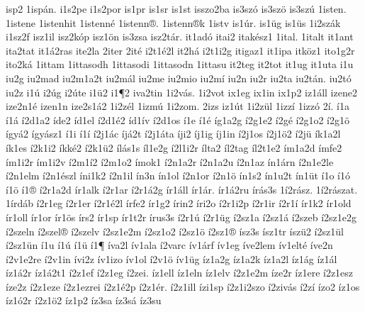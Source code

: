 {isp2
1isp^^e1n.
i1s2pe
i1s2por
is1pr
is1sr
is1st
isszo2ba
is3sz^^f3
is3sz^^f6
is3sz^^fa
1isten.
1istene
1istenhit
1istenn^^e9
1istenn^^ae.
1istenn^^aek
1istv
is1^^far.
is1^^fcg
is1^^fcs
1i2sz^^e1k
i1sz2f
isz1il
isz2k^^f3p
isz1^^f6n
is3zsa
isz2t^^e1r.
it1ad^^f3
itai2
itak^^e9sz1
1ital.
1italt
it1ant
ita2tat
it1^^e12ras
ite2la
2iter
2it^^e9
i2t1^^e92l
it2h^^e1
i2t1i2g
itigaz1
it1ipa
itk^^f6z1
ito1g2r
ito2k^^e1
1ittam
1ittasodh
1ittasodi
1ittasodn
1ittasu
it2teg
it2tot
it1ug
it1uta
i1u
iu2g
iu2mad
iu2m1a2t
iu2m^^e1l
iu2me
iu2mio
iu2m^^ed
iu2n
iu2r
iu2ta
iu2t^^e1n.
iu2t^^f3
iu2z
i1^^fa
i2^^fag
i2^^fate
i1^^fc2
i1^^b62
iva2tin
1i2v^^e1s.
1i2vot
ix1eg
ix1in
ix1p2
iz1^^e1ll
izene2
ize2n1^^e9
izen1n
ize2s1^^e12
1i2z^^e9l
1izm^^fa
1i2zom.
2izs
iz1^^fat
1i2z^^fcl
1izz^^ed
1izz^^f3
2^^ed.
^^ed1a
^^ed1^^e1
^^ed2d1a2
^^edde2
^^edd1el
^^ed2d1^^e92
^^edd1^^edv
^^ed2d1os
^^ed1e
^^ed1^^e9
^^edg1a2g
^^ed2g1e2
^^ed2g^^e9
^^ed2g1o2
^^ed2g1^^f6
^^edgy^^e12
^^edgy^^e1sz1
^^ed1i
^^ed1^^ed
^^ed2j1^^e1c
^^edj^^e12t
^^ed2j1^^e1ta
^^edji2
^^edj1ig
^^edj1in
^^ed2j1os
^^ed2j1^^f62
^^ed2j^^fc
^^edk1a2l
^^edk1es
^^ed2k1i2
^^edkk^^e92
^^ed2k1^^fc2
^^edl^^e1s1s
^^edl1e2g
^^ed2l1i2r
^^edlta2
^^edl2tag
^^edl2t1e2
^^edm1a2d
^^edmfe2
^^edm1i2r
^^edm1i2v
^^ed2m1^^ed2
^^ed2m1o2
^^edmok1
^^ed2n1a2r
^^ed2n1a2u
^^ed2n1az
^^edn1^^e1rn
^^ed2n1e2le
^^ed2n1elm
^^ed2n1^^e9szl
^^edni1k2
^^ed2n1il
^^edn3n
^^edn1ol
^^ed2n1or
^^ed2n1^^f6
^^edn1s2
^^edn1u2t
^^edn1^^fct
^^ed1o
^^ed1^^f3
^^ed1^^f6
^^ed1^^ae
^^ed2r1a2d
^^edr1alk
^^ed2r1ar
^^ed2r1^^e12g
^^edr1^^e1ll
^^edr1^^e1r.
^^edr1^^e12ru
^^edr^^e1s3s
1^^ed2r^^e1sz.
1^^ed2r^^e1szat.
1^^edrd^^e1b
^^ed2r1eg
^^ed2r1er
^^ed2r1^^e92l
^^edrfe2
^^edr1g2
^^edrin2
^^edri2o
^^ed2r1i2p
^^ed2r1ir
^^ed2r1^^ed
^^edr1k2
^^edr1old
^^edr1oll
^^edr1or
^^edr1^^f6s
^^edrs2
^^edr1sp
^^edr1t2r
^^edrus3s
^^ed2r1^^fa
^^ed2r1^^fcg
^^ed2sz1a
^^ed2sz1^^e1
^^ed2szeb
^^ed2sz1e2g
^^ed2szeln
^^ed2szel^^ae
^^ed2szelv
^^ed2sz1e2m
^^ed2sz1o2
^^ed2sz1^^f6
^^ed2sz1^^ae
^^edsz3s
^^edsz1tr
^^edsz^^fc2
^^ed2sz1^^fcl
^^ed2sz1^^fcn
^^ed1u
^^ed1^^fa
^^ed1^^fc
^^ed1^^b6
^^edva2l
^^edv1ala
^^ed2varc
^^edv1^^e1rf
^^edv1eg
^^edve2lem
^^edv1elt^^e9
^^edve2n
^^ed2v1e2re
^^ed2v1in
^^edvi2z
^^edv1izo
^^edv1ol
^^ed2v1^^f6
^^edv1^^fcg
^^edz1a2g
^^edz1a2k
^^edz1a2l
^^edz1^^e1g
^^edz1^^e1l
^^edz1^^e12r
^^edz1^^e12t1
^^ed2z1ef
^^ed2z1eg
^^ed2zei.
^^edz1ell
^^edz1eln
^^edz1elv
^^ed2z1e2m
^^edze2r
^^edz1ere
^^ed2z1esz
^^edze2z
^^ed2z1eze
^^ed2z1ezrei
^^ed2z1^^e92p
^^ed2z1^^e9r.
^^ed2z1ill
^^edzi1sp
^^ed2z1i2szo
^^ed2ziv^^e1s
^^ed2z^^ed
^^edzo2
^^edz1os
^^edz1^^f32r
^^ed2z1^^f62
^^edz1p2
^^edz3sa
^^edz3s^^e1
^^edz3su
}
